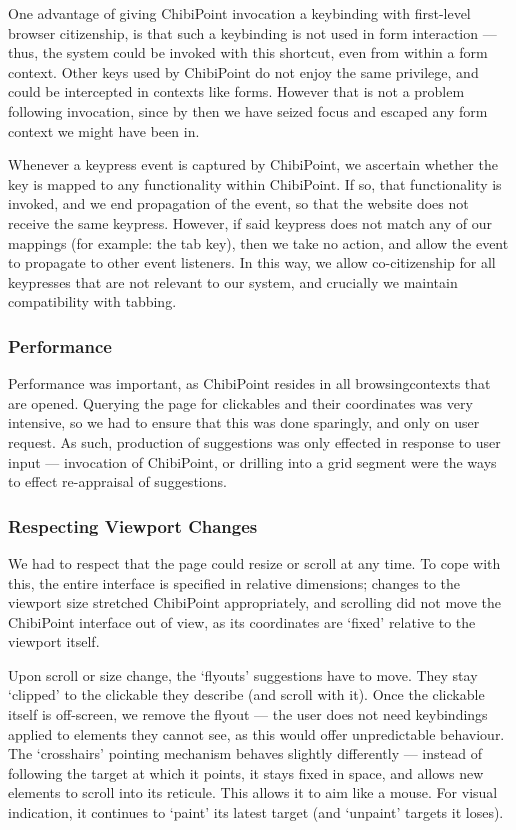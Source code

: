 \documentclass[11pt,openright,a4paper]{report}
\begin{document}
One advantage of giving ChibiPoint invocation a keybinding with first-level browser citizenship, is that such a keybinding is not used in form interaction --- thus, the system could be invoked with this shortcut, even from within a form context. Other keys used by ChibiPoint do not enjoy the same privilege, and could be intercepted in contexts like forms. However that is not a problem following invocation, since by then we have seized focus and escaped any form context we might have been in.

\label{sec:tabbing_cocitizenship}
Whenever a keypress event is captured by ChibiPoint, we ascertain whether the key is mapped to any functionality within ChibiPoint. If so, that functionality is invoked, and we end propagation of the event, so that the website does not receive the same keypress. However, if said keypress does not match any of our mappings (for example: the tab key), then we take no action, and allow the event to propagate to other event listeners. In this way, we allow co-citizenship for all keypresses that are not relevant to our system, and crucially we maintain compatibility with tabbing.

\subsubsection{Performance}
Performance was important, as ChibiPoint resides in all \glspl{browsingcontext} that are opened. Querying the page for clickables and their coordinates was very intensive, so we had to ensure that this was done sparingly, and only on user request. As such, production of suggestions was only effected in response to user input --- invocation of ChibiPoint, or drilling into a grid segment were the ways to effect re-appraisal of suggestions.

\subsubsection{Respecting Viewport Changes}
We had to respect that the page could resize or scroll at any time. To cope with this, the entire interface is specified in relative dimensions; changes to the viewport size stretched ChibiPoint appropriately, and scrolling did not move the ChibiPoint interface out of view, as its coordinates are `fixed' relative to the viewport itself.

Upon scroll or size change, the `flyouts' suggestions have to move. They stay `clipped' to the clickable they describe (and scroll with it). Once the clickable itself is off-screen, we remove the flyout --- the user does not need keybindings applied to elements they cannot see, as this would offer unpredictable behaviour. The `crosshairs' pointing mechanism behaves slightly differently --- instead of following the target at which it points, it stays fixed in space, and allows new elements to scroll into its reticule. This allows it to aim like a mouse. For visual indication, it continues to `paint' its latest target (and `unpaint' targets it loses).
\end{document}
